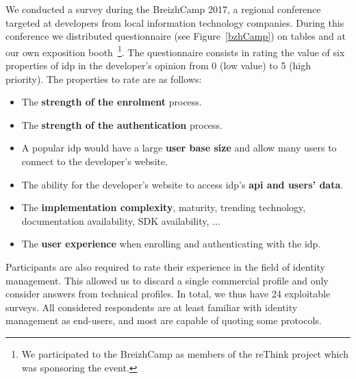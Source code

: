 We conducted a survey during the BreizhCamp 2017, a regional conference targeted at developers from local information technology companies.
During this conference we distributed questionnaire (see Figure~\ref{bzhCamp}) on tables and at our own exposition booth~\footnote{We participated to the BreizhCamp as members of the reThink project which was sponsoring the event.}.
The questionnaire consists in rating the value of six properties of \gls{idp} in the developer's opinion from 0 (low value) to 5 (high priority).
The properties to rate are as follows: 
\begin{itemize}
\item The \textbf{strength of the enrolment} process.
\item The \textbf{strength of the authentication} process.
\item A popular \gls{idp} would have a large \textbf{user base size} and allow many users to connect to the developer's website.
\item The ability for the developer's website to access \gls{idp}'s \textbf{\gls{api} and users' data}.
\item The \textbf{implementation complexity}, \ie maturity, trending technology, documentation availability, SDK availability, ...
\item The \textbf{user experience} when enrolling and authenticating with the \gls{idp}.
\end{itemize} 
Participants are also required to rate their experience in the field of identity management.
This allowed us to discard a single commercial profile and only consider answers from technical profiles.
In total, we thus have 24 exploitable surveys.
All considered respondents are at least familiar with identity management as end-users, and most are capable of quoting some protocols.

